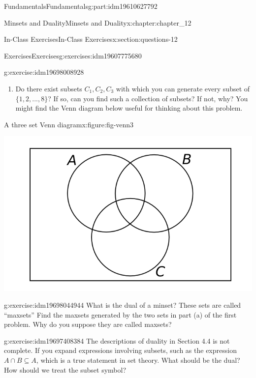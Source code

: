 \documentclass[oneside,10pt,]{book}
\numberwithin{equation}{section}
\begin{document}
\begin{partptx}{Fundamentals}{}{Fundamentals}{}{}{g:part:idm19610627792}
\begin{chapterptx}{Minsets and Duality}{}{Minsets and Duality}{}{}{x:chapter:chapter_12}
\begin{sectionptx}{In-Class Exercises}{}{In-Class Exercises}{}{}{x:section:questions-12}
\begin{exercises-subsection-numberless}{Exercises}{}{Exercises}{}{}{g:exercises:idm19607775680}
\begin{exercisegroup}
\begin{divisionexerciseeg}{2}{}{}{g:exercise:idm19698008928}
\begin{enumerate}[label=(\alph*)]
\item{}Do there exist subsets \(C_1, C_2, C_3\) with which you can generate every subset of \(\{1,2, . . . ,8\}\)?  If so, can you find such a collection of subsets?  If not, why?  You might find the Venn diagram below useful for thinking about this problem.%
\end{enumerate}
%
\begin{figureptx}{A three set Venn diagram}{x:figure:fig-venn3}{}%
\begin{image}{0.05}{0.9}{0.05}%
\includegraphics[width=\linewidth]{images/fig-venn3.png}
\end{image}%
\tcblower
\end{figureptx}%
\end{divisionexerciseeg}%
\begin{divisionexerciseeg}{3}{}{}{g:exercise:idm19698044944}%
What is the dual of a minset?  These sets are called ``maxsets''  Find the maxsets generated by the two sets in part (a) of the first problem.   Why do you suppose they are called maxsets?%
\end{divisionexerciseeg}%
\begin{divisionexerciseeg}{4}{}{}{g:exercise:idm19697408384}%
The descriptions of duality in Section 4.4 is not complete.  If you expand expressions involving subsets, such as the expression \(A \cap B \subseteq A\), which is a true statement in set theory.  What should be the dual?  How should we treat the subset symbol?%
\end{divisionexerciseeg}%
\end{exercisegroup}
\par\medskip\noindent
\end{exercises-subsection-numberless}
\end{sectionptx}

\end{chapterptx}
\end{partptx}
\end{document}
